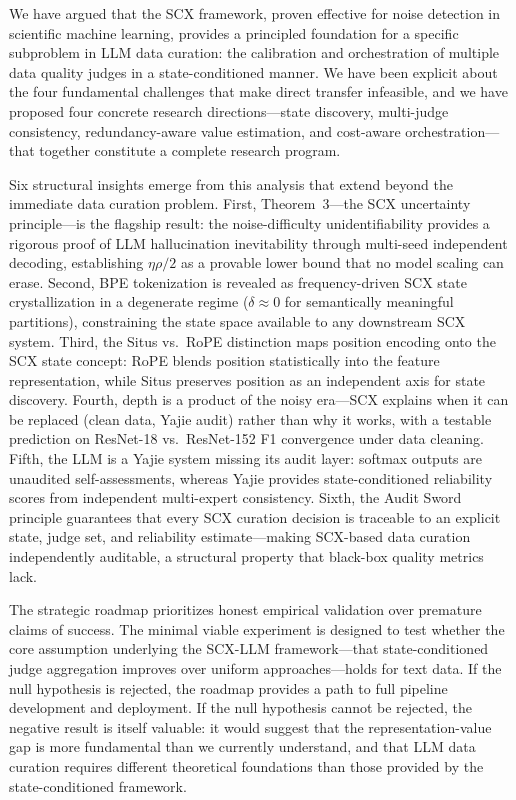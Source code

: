 \documentclass[11pt,twocolumn]{article}
\begin{document}
We have argued that the SCX framework, proven effective for noise detection in scientific machine learning, provides a principled foundation for a specific subproblem in LLM data curation: the calibration and orchestration of multiple data quality judges in a state-conditioned manner. We have been explicit about the four fundamental challenges that make direct transfer infeasible, and we have proposed four concrete research directions---state discovery, multi-judge consistency, redundancy-aware value estimation, and cost-aware orchestration---that together constitute a complete research program.

Six structural insights emerge from this analysis that extend beyond the immediate data curation problem. First, Theorem~3---the SCX uncertainty principle---is the flagship result: the noise-difficulty unidentifiability provides a rigorous proof of LLM hallucination inevitability through multi-seed independent decoding, establishing $\eta\rho/2$ as a provable lower bound that no model scaling can erase. Second, BPE tokenization is revealed as frequency-driven SCX state crystallization in a degenerate regime ($\delta \approx 0$ for semantically meaningful partitions), constraining the state space available to any downstream SCX system. Third, the Situs vs.\ RoPE distinction maps position encoding onto the SCX state concept: RoPE blends position statistically into the feature representation, while Situs preserves position as an independent axis for state discovery. Fourth, depth is a product of the noisy era---SCX explains when it can be replaced (clean data, Yajie audit) rather than why it works, with a testable prediction on ResNet-18 vs.\ ResNet-152 F1 convergence under data cleaning. Fifth, the LLM is a Yajie system missing its audit layer: softmax outputs are unaudited self-assessments, whereas Yajie provides state-conditioned reliability scores from independent multi-expert consistency. Sixth, the Audit Sword principle guarantees that every SCX curation decision is traceable to an explicit state, judge set, and reliability estimate---making SCX-based data curation independently auditable, a structural property that black-box quality metrics lack.

The strategic roadmap prioritizes honest empirical validation over premature claims of success. The minimal viable experiment is designed to test whether the core assumption underlying the SCX-LLM framework---that state-conditioned judge aggregation improves over uniform approaches---holds for text data. If the null hypothesis is rejected, the roadmap provides a path to full pipeline development and deployment. If the null hypothesis cannot be rejected, the negative result is itself valuable: it would suggest that the representation-value gap is more fundamental than we currently understand, and that LLM data curation requires different theoretical foundations than those provided by the state-conditioned framework.
\end{document}
